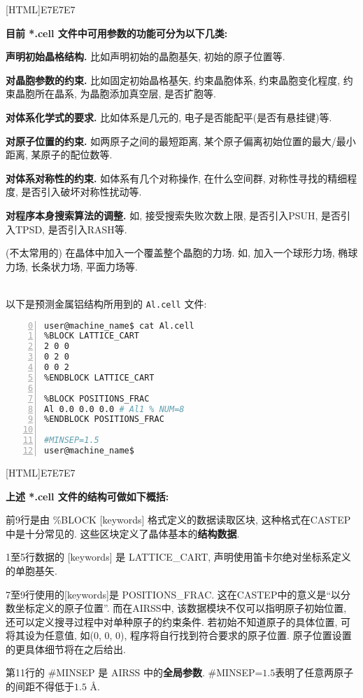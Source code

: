 \documentclass[a4paper, 10pt]{article}
\begin{document}
\noindent{}[HTML]{E7E7E7}{\parbox{\textwidth}{%
\noindent \textbf{目前 *.cell 文件中可用参数的功能可分为以下几类:}
\begin{maineu}
  \item \textbf{声明初始晶格结构.} 比如声明初始的晶胞基矢, 初始的原子位置等.
  \item \textbf{对晶胞参数的约束.} 比如固定初始晶格基矢, 约束晶胞体系, 约束晶胞变化程度, 约束晶胞所在晶系, 为晶胞添加真空层, 是否扩胞等.
  \item \textbf{对体系化学式的要求.} 比如体系是几元的, 电子是否能配平(是否有悬挂键)等.
  \item \textbf{对原子位置的约束.} 如两原子之间的最短距离, 某个原子偏离初始位置的最大/最小距离, 某原子的配位数等. 
  \item \textbf{对体系对称性的约束.} 如体系有几个对称操作, 在什么空间群, 对称性寻找的精细程度, 是否引入破坏对称性扰动等.
  \item \textbf{对程序本身搜索算法的调整.} 如, 接受搜索失败次数上限, 是否引入PSUH, 是否引入TPSD, 是否引入RASH等.
  \item (不太常用的) 在晶体中加入一个覆盖整个晶胞的力场. 如, 加入一个球形力场, 椭球力场, 长条状力场, 平面力场等.
\end{maineu}}}\\

以下是预测金属铝结构所用到的 \verb|Al.cell| 文件:
\begin{lstlisting}[language={bash},numbers=left,firstnumber=0]
user@machine_name$ cat Al.cell
%BLOCK LATTICE_CART
2 0 0
0 2 0
0 0 2 
%ENDBLOCK LATTICE_CART

%BLOCK POSITIONS_FRAC
Al 0.0 0.0 0.0 # Al1 % NUM=8
%ENDBLOCK POSITIONS_FRAC

#MINSEP=1.5
user@machine_name$
\end{lstlisting}


\noindent{}[HTML]{E7E7E7}{\parbox{\textwidth}{%
\noindent \textbf{上述 *.cell 文件的结构可做如下概括:}
\begin{maineu}
  \item 前9行是由 \%BLOCK [keywords] 格式定义的数据读取区块, 这种格式在CASTEP中是十分常见的. 这些区块定义了晶体基本的\textbf{结构数据}.   
  \item 1至5行数据的 [keywords] 是 LATTICE\_CART, 声明使用笛卡尔绝对坐标系定义的单胞基矢. 
  \item 7至9行使用的[keywords]是 POSITIONS\_FRAC. 这在CASTEP中的意义是``以分数坐标定义的原子位置''. 而在AIRSS中, 该数据模块不仅可以指明原子初始位置, 还可以定义搜寻过程中对单种原子的约束条件. 若初始不知道原子的具体位置, 可将其设为任意值, 如(0, 0, 0), 程序将自行找到符合要求的原子位置. 原子位置设置的更具体细节将在之后给出. 
  \item 第11行的 \#MINSEP 是 AIRSS 中的\textbf{全局参数}. \#MINSEP=\(1.5\)表明了任意两原子的间距不得低于\(1.5\) \r{A}.
\end{maineu}}}\\
\end{document}
